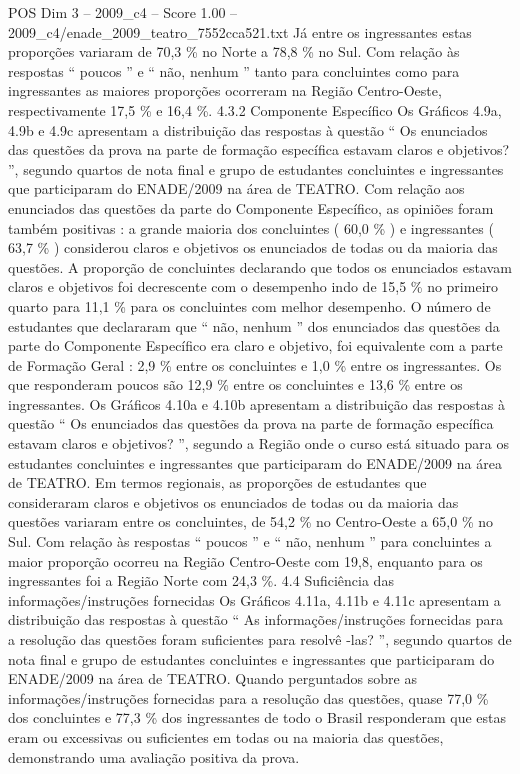 \begin{textsample}{POS Dim 3 – 2009\_c4 – Score 1.00 – 2009\_c4/enade\_2009\_teatro\_7552cca521.txt}
Já entre os ingressantes estas proporções variaram de 70,3 \% no Norte a 78,8 \% no Sul.
Com relação às respostas “ poucos ” e “ não, nenhum ” tanto para concluintes como para ingressantes as maiores proporções ocorreram na Região Centro-Oeste, respectivamente 17,5 \% e 16,4 \%. 4.3.2 Componente Específico Os Gráficos 4.9a, 4.9b e 4.9c apresentam a distribuição das respostas à questão “ Os enunciados das questões da prova na parte de formação específica estavam claros e objetivos? ”, segundo quartos de nota final e grupo de estudantes concluintes e ingressantes que participaram do ENADE/2009 na área de TEATRO.
Com relação aos enunciados das questões da parte do Componente Específico, as opiniões foram também positivas : a grande maioria dos concluintes ( 60,0 \% ) e ingressantes ( 63,7 \% ) considerou claros e objetivos os enunciados de todas ou da maioria das questões.
A proporção de concluintes declarando que todos os enunciados estavam claros e objetivos foi decrescente com o desempenho indo de 15,5 \% no primeiro quarto para 11,1 \% para os concluintes com melhor desempenho.
O número de estudantes que declararam que “ não, nenhum ” dos enunciados das questões da parte do Componente Específico era claro e objetivo, foi equivalente com a parte de Formação Geral : 2,9 \% entre os concluintes e 1,0 \% entre os ingressantes.
Os que responderam poucos são 12,9 \% entre os concluintes e 13,6 \% entre os ingressantes.
Os Gráficos 4.10a e 4.10b apresentam a distribuição das respostas à questão “ Os enunciados das questões da prova na parte de formação específica estavam claros e objetivos? ”, segundo a Região onde o curso está situado para os estudantes concluintes e ingressantes que participaram do ENADE/2009 na área de TEATRO.
Em termos regionais, as proporções de estudantes que consideraram claros e objetivos os enunciados de todas ou da maioria das questões variaram entre os concluintes, de 54,2 \% no Centro-Oeste a 65,0 \% no Sul.
Com relação às respostas “ poucos ” e “ não, nenhum ” para concluintes a maior proporção ocorreu na Região Centro-Oeste com 19,8, enquanto para os ingressantes foi a Região Norte com 24,3 \%. 4.4 Suficiência das informações/instruções fornecidas Os Gráficos 4.11a, 4.11b e 4.11c apresentam a distribuição das respostas à questão “ As informações/instruções fornecidas para a resolução das questões foram suficientes para resolvê -las? ”, segundo quartos de nota final e grupo de estudantes concluintes e ingressantes que participaram do ENADE/2009 na área de TEATRO.
Quando perguntados sobre as informações/instruções fornecidas para a resolução das questões, quase 77,0 \% dos concluintes e 77,3 \% dos ingressantes de todo o Brasil responderam que estas eram ou excessivas ou suficientes em todas ou na maioria das questões, demonstrando uma avaliação positiva da prova.

\end{textsample}
